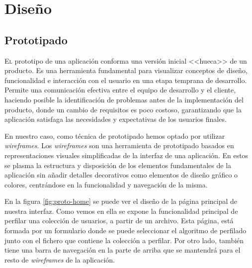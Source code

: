 \chapter{Diseño}
\label{chap:design}
\section{Prototipado}
\label{sec:prototipo}
\lettrine{E}{l} prototipo de una aplicación conforma una versión inicial <<hueca>> de un producto. Es una herramienta fundamental para visualizar conceptos de diseño, funcionalidad e interacción con el usuario en una etapa temprana de desarrollo. Permite una comunicación efectiva entre el equipo de desarrollo y el cliente, haciendo posible la identificación de problemas antes de la implementación del producto, donde un cambio de requisitos es poco costoso, garantizando que la aplicación satisfaga las necesidades y expectativas de los usuarios finales.

En nuestro caso, como técnica de prototipado hemos optado por utilizar \textit{wireframes}. Los \textit{wireframes} son una herramienta de prototipado basados en representaciones visuales simplificadas de la interfaz de una aplicación. En estos se plasma la estructura y disposición de los elementos fundamentales de la aplicación sin añadir detalles decorativos como elementos de diseño gráfico o colores, centrándose en la funcionalidad y navegación de la misma.

En la figura \ref{fig:proto-home} se puede ver el diseño de la página principal de nuestra interfaz. Como vemos en ella se expone la funcionalidad principal de perfilar una colección de usuarios, a partir de un archivo. Esta página, está formada por un formulario donde se puede seleccionar el algoritmo de perfilado junto con el fichero que contiene la colección a perfilar. Por otro lado, también tiene una barra de navegación en la parte de arriba que se mantendrá para el resto de \textit{wireframes} de la aplicación.

